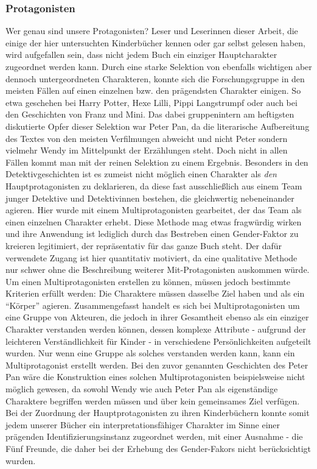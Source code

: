 \subsubsection{Protagonisten}

Wer genau sind unsere Protagonisten? Leser und Leserinnen dieser Arbeit,
die einige der hier untersuchten Kinderbücher kennen oder gar selbst
gelesen haben, wird aufgefallen sein, dass nicht jedem Buch ein einziger
Hauptcharakter zugeordnet werden kann. Durch eine starke Selektion von
ebenfalls wichtigen aber dennoch untergeordneten Charakteren, konnte
sich die Forschungsgruppe in den meisten Fällen auf einen einzelnen bzw.
den prägendsten Charakter einigen. So etwa geschehen bei Harry Potter,
Hexe Lilli, Pippi Langstrumpf oder auch bei den Geschichten von Franz
und Mini. Das dabei gruppenintern am heftigsten diskutierte Opfer dieser
Selektion war Peter Pan, da die literarische Aufbereitung des Textes von
den meisten Verfilmungen abweicht und nicht Peter sondern vielmehr Wendy
im Mittelpunkt der Erzählungen steht. Doch nicht in allen Fällen kommt
man mit der reinen Selektion zu einem Ergebnis. Besonders in den
Detektivgeschichten ist es zumeist nicht möglich einen Charakter als
\emph{den} Hauptprotagonisten zu deklarieren, da diese fast
ausschließlich aus einem Team junger Detektive und Detektivinnen
bestehen, die gleichwertig nebeneinander agieren. Hier wurde mit einem
Multiprotagonisten gearbeitet, der das Team als einen einzelnen
Charakter erhebt. Diese Methode mag etwas fragwürdig wirken und ihre
Anwendung ist lediglich durch das Bestreben einen Gender-Faktor zu
kreieren legitimiert, der repräsentativ für das ganze Buch steht. Der
dafür verwendete Zugang ist hier quantitativ motiviert, da eine
qualitative Methode nur schwer ohne die Beschreibung weiterer
Mit-Protagonisten auskommen würde. Um einen Multiprotagonisten erstellen
zu können, müssen jedoch bestimmte Kriterien erfüllt werden: Die
Charaktere müssen dasselbe Ziel haben und als ein ``Körper'' agieren.
Zusammengefasst handelt es sich bei Multiprotagonisten um eine Gruppe
von Akteuren, die jedoch in ihrer Gesamtheit ebenso als ein einziger
Charakter verstanden werden können, dessen komplexe Attribute - aufgrund
der leichteren Verständlichkeit für Kinder - in verschiedene
Persönlichkeiten aufgeteilt wurden. Nur wenn eine Gruppe als solches
verstanden werden kann, kann ein Multiprotagonist erstellt werden. Bei
den zuvor genannten Geschichten des Peter Pan wäre die Konstruktion
eines solchen Multiprotagonisten beispielsweise nicht möglich gewesen,
da sowohl Wendy wie auch Peter Pan als eigenständige Charaktere
begriffen werden müssen und über kein gemeinsames Ziel verfügen. Bei der
Zuordnung der Hauptprotagonisten zu ihren Kinderbüchern konnte somit
jedem unserer Bücher ein interpretationsfähiger Charakter im Sinne einer
prägenden Identifizierungsinstanz zugeordnet werden, mit einer Ausnahme
- die Fünf Freunde, die daher bei der Erhebung des Gender-Fakors nicht
berücksichtigt wurden.

